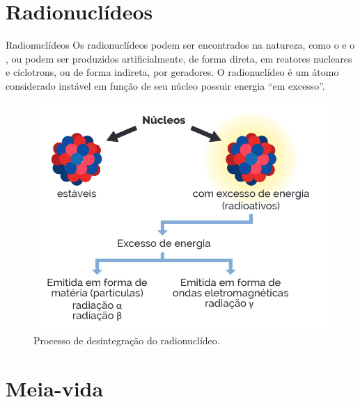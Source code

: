 \documentclass[presentation,professionalfonts,aspectratio=169]{beamer}
\begin{document}
\section{Radionuclídeos}
\label{sec:org2bdef84}

\begin{frame}[label={sec:org2825bb8}]{Radionuclídeos}
Os radionuclídeos podem ser encontrados na natureza, como o   e o , ou podem ser produzidos artificialmente, de forma direta, em reatores nucleares e cíclotrons, ou de forma indireta, por geradores. O radionuclídeo é um átomo considerado instável em função de seu núcleo possuir energia “em excesso”.

\begin{figure}[H]
\centering
\includegraphics[scale=0.24]{FQ/Radioatividade/nucleo.png}
\caption{\label{fig:org04c6a03}Processo de desintegração do radionuclídeo.}
\end{figure}
\end{frame}


\section{Meia-vida}
\label{sec:org2583f5b}
\end{document}

